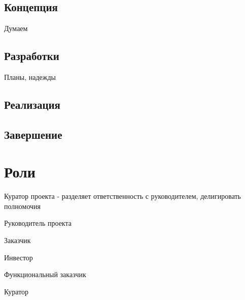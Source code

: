 \subsection{Концепция}
Думаем
\subsection{Разработки}
Планы, надежды
\subsection{Реализация}
\subsection{Завершение}

\section{Роли}

\begin{itemsize}
\item Куратор проекта - разделяет ответственность с руководителем, делигировать полномочия
\item Руководитель проекта
\item Заказчик
\item Инвестор
\item Функциональный заказчик
\item Куратор
\end{itemsize}
